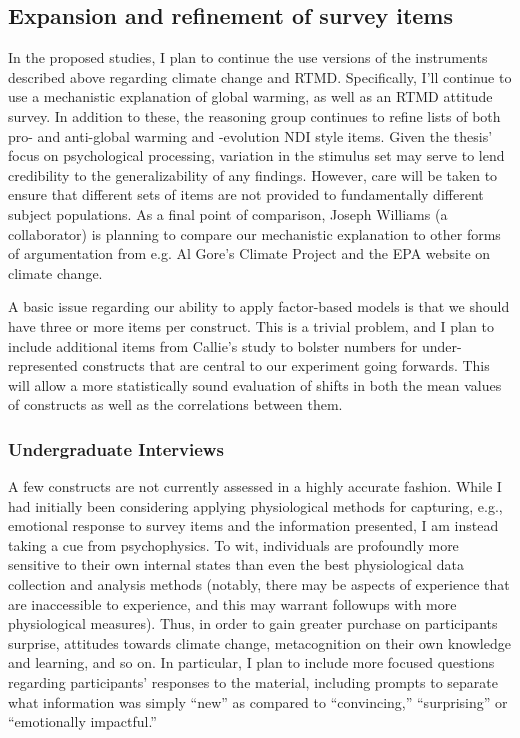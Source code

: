 \subsection{Expansion and refinement of survey items}

In the proposed studies, I plan to continue the use versions of the instruments
described above regarding climate change and RTMD. Specifically, I'll continue
to use a mechanistic explanation of global warming, as well as an RTMD attitude
survey. In addition to these, the reasoning group continues to refine lists of
both pro- and anti-global warming and -evolution NDI style items. Given the
thesis' focus on psychological processing, variation in the stimulus set may
serve to lend credibility to the generalizability of any findings. However, care
will be taken to ensure that different sets of items are not provided to
fundamentally different subject populations. As a final point of comparison,
Joseph Williams (a collaborator) is planning to compare our mechanistic
explanation to other forms of argumentation from e.g. Al Gore's Climate Project
and the EPA website on climate change.

A basic issue regarding our ability to apply factor-based models is that we
should have three or more items per construct. This is a trivial problem, and I
plan to include additional items from Callie's study to bolster numbers for
under-represented constructs that are central to our experiment going forwards.
This will allow a more statistically sound evaluation of shifts in both the mean
values of constructs as well as the correlations between them.

\subsubsection{Undergraduate Interviews}
\label{sec:interviews}

A few constructs are not currently assessed in a highly accurate fashion. While
I had initially been considering applying physiological methods for capturing,
e.g., emotional response to survey items and the information presented, I am
instead taking a cue from psychophysics. To wit, individuals are profoundly more
sensitive to their own internal states than even the best physiological data
collection and analysis methods (notably, there may be aspects of experience
that are inaccessible to experience, and this may warrant followups with more
physiological measures). Thus, in order to gain greater purchase on participants
surprise, attitudes towards climate change, metacognition on their own knowledge
and learning, and so on. In particular, I plan to include more focused questions
regarding participants' responses to the material, including prompts to separate
what information was simply ``new'' as compared to ``convincing,''
``surprising'' or ``emotionally impactful.''


